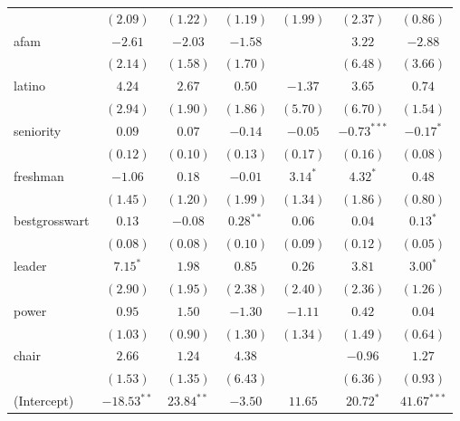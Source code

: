 \documentclass[12pt]{article}
\begin{document}
\begin{table}
\begin{center}
\begin{tabular}{l c c c c c c }
			& $(2.09)$      & $(1.22)$     & $(1.19)$     & $(1.99)$     & $(2.37)$      & $(0.86)$      \\
			afam                   & $-2.61$       & $-2.03$      & $-1.58$      &              & $3.22$        & $-2.88$       \\
			& $(2.14)$      & $(1.58)$     & $(1.70)$     &              & $(6.48)$      & $(3.66)$      \\
			latino                 & $4.24$        & $2.67$       & $0.50$       & $-1.37$      & $3.65$        & $0.74$        \\
			& $(2.94)$      & $(1.90)$     & $(1.86)$     & $(5.70)$     & $(6.70)$      & $(1.54)$      \\
			seniority              & $0.09$        & $0.07$       & $-0.14$      & $-0.05$      & $-0.73^{***}$ & $-0.17^{*}$   \\
			& $(0.12)$      & $(0.10)$     & $(0.13)$     & $(0.17)$     & $(0.16)$      & $(0.08)$      \\
			freshman               & $-1.06$       & $0.18$       & $-0.01$      & $3.14^{*}$   & $4.32^{*}$    & $0.48$        \\
			& $(1.45)$      & $(1.20)$     & $(1.99)$     & $(1.34)$     & $(1.86)$      & $(0.80)$      \\
			bestgrosswart          & $0.13$        & $-0.08$      & $0.28^{**}$  & $0.06$       & $0.04$        & $0.13^{*}$    \\
			& $(0.08)$      & $(0.08)$     & $(0.10)$     & $(0.09)$     & $(0.12)$      & $(0.05)$      \\
			leader                 & $7.15^{*}$    & $1.98$       & $0.85$       & $0.26$       & $3.81$        & $3.00^{*}$    \\
			& $(2.90)$      & $(1.95)$     & $(2.38)$     & $(2.40)$     & $(2.36)$      & $(1.26)$      \\
			power                  & $0.95$        & $1.50$       & $-1.30$      & $-1.11$      & $0.42$        & $0.04$        \\
			& $(1.03)$      & $(0.90)$     & $(1.30)$     & $(1.34)$     & $(1.49)$      & $(0.64)$      \\
			chair                  & $2.66$        & $1.24$       & $4.38$       &              & $-0.96$       & $1.27$        \\
			& $(1.53)$      & $(1.35)$     & $(6.43)$     &              & $(6.36)$      & $(0.93)$      \\
			(Intercept)            & $-18.53^{**}$ & $23.84^{**}$ & $-3.50$      & $11.65$      & $20.72^{*}$   & $41.67^{***}$ \\

\end{tabular}
\end{center}
\end{table}
\end{document}
